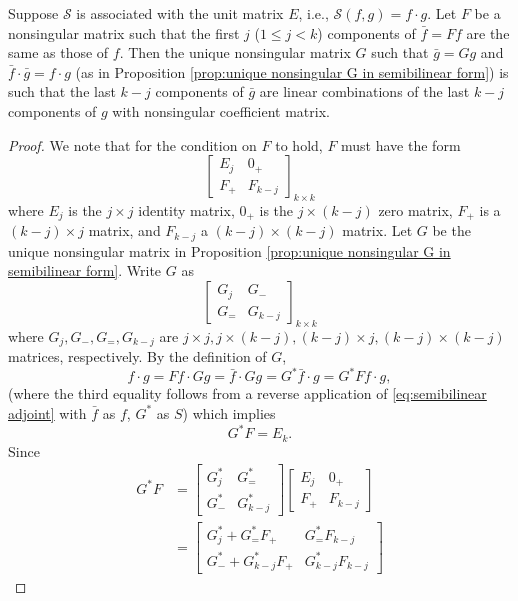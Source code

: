 \documentclass[11pt, oneside, a4paper]{article}
\begin{document}
\begin{prop}\cite[p.287]{CoddingtonLevinson}\label{prop:last k-j components linear combination}
    Suppose $\mathcal{S}$ is associated with the unit matrix $E$, i.e., $\mathcal{S}(f,g)=f\cdot g$. Let $F$ be a nonsingular matrix such that the first $j$ ($1\leq j<k$) components of $\bar{f}=Ff$ are the same as those of $f$. Then the unique nonsingular matrix $G$ such that $\bar{g}=Gg$ and $\bar{f}\cdot \bar{g}=f\cdot g$ (as in Proposition \ref{prop:unique nonsingular G in semibilinear form}) is such that the last $k-j$ components of $\bar{g}$ are linear combinations of the last $k-j$ components of $g$ with nonsingular coefficient matrix.
\end{prop}
\begin{proof}
    We note that for the condition on $F$ to hold, $F$ must have the form
\[\begin{bmatrix}E_j & 0_+\\
F_+ & F_{k-j}\end{bmatrix}_{k\times k}\]
where $E_j$ is the $j\times j$ identity matrix, $0_+$ is the $j\times (k-j)$ zero matrix, $F_+$ is a $(k-j)\times j$ matrix, and $F_{k-j}$ a $(k-j)\times (k-j)$ matrix. Let $G$ be the unique nonsingular matrix in Proposition \ref{prop:unique nonsingular G in semibilinear form}. Write $G$ as
\[\begin{bmatrix}G_j & G_-\\
G_= & G_{k-j}\end{bmatrix}_{k\times k}\]
where $G_j, G_-, G_=, G_{k-j}$ are $j\times j, j\times (k-j), (k-j)\times j, (k-j)\times (k-j)$ matrices, respectively. By the definition of $G$,
\[f\cdot g = Ff\cdot Gg = \bar{f}\cdot Gg = G^*\bar{f}\cdot g = G^*Ff\cdot g,\]
(where the third equality follows from a reverse application of \eqref{eq:semibilinear adjoint} with $\bar{f}$ as $f$, $G^*$ as $S$) which implies
\[G^*F = E_k.\]
Since
\begin{align*}
    G^*F &= \begin{bmatrix}
        G^*_j & G^*_=\\
        G^*_- & G^*_{k-j}
    \end{bmatrix}\begin{bmatrix}E_j & 0_+\\
    F_+ & F_{k-j}\end{bmatrix}\\
    &= \begin{bmatrix}
        G^*_j + G^*_= F_+ & G^*_= F_{k-j}\\
        G^*_- + G^*_{k-j} F_+ & G^*_{k-j}F_{k-j}

\end{bmatrix}
\end{align*}
\end{proof}
\end{document}
